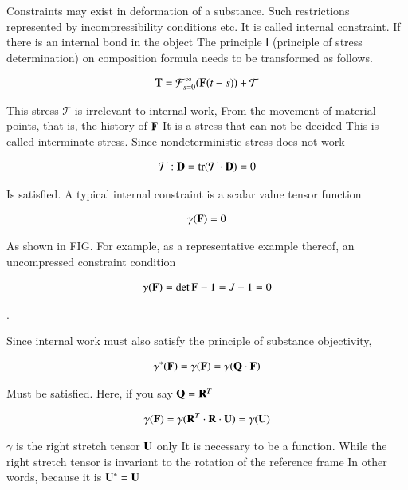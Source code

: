 Constraints may exist in deformation of a substance.
Such restrictions represented by incompressibility conditions etc.
It is called internal constraint.
If there is an internal bond in the object
The principle Ⅰ (principle of stress determination) on composition formula needs to be transformed as follows.

\begin{eqnarray}
{\mathbf{T}}=\mathcal{F}_{s=0}^{\infty}({\mathbf{F}}(t-s))+\mathcal{T}
\end{eqnarray}

This stress $\mathcal{T}$ is irrelevant to internal work,
From the movement of material points, that is, the history of $\mathbf{F}$
It is a stress that can not be decided
This is called interminate stress.
Since nondeterministic stress does not work

\begin{eqnarray}
\mathcal{T} : {\mathbf{D}} = \mathrm{tr}( \mathcal{T} \cdot {\mathbf{D}}) = 0
\end{eqnarray}

Is satisfied. A typical internal constraint is a scalar value tensor function

\begin{eqnarray}
\gamma({\mathbf{F}}) = 0
\end{eqnarray}

As shown in FIG. For example, as a representative example thereof, an uncompressed constraint condition

\begin{eqnarray}
\gamma({\mathbf{F}}) = \det{\mathbf{F}} - 1 = J-1 = 0
\end{eqnarray}

.

Since internal work must also satisfy the principle of substance objectivity,

\begin{eqnarray}
\gamma^*({\mathbf{F}}) = \gamma({\mathbf{F}}) = \gamma({\mathbf{Q}} \cdot {\mathbf{F}})
\end{eqnarray}


Must be satisfied.
Here, if you say $\mathbf{Q}={\mathbf{R}^T}$

\begin{eqnarray}
\gamma({\mathbf{F}}) = \gamma({\mathbf{R}^T} \cdot {\mathbf{R}} \cdot {\mathbf{U}})  =  \gamma({\mathbf{U}})
\end{eqnarray}

$\gamma$ is the right stretch tensor $\mathbf{U}$ only
It is necessary to be a function.
While the right stretch tensor is invariant to the rotation of the reference frame
In other words, because it is $\mathbf{U}^*=\mathbf{U}$

